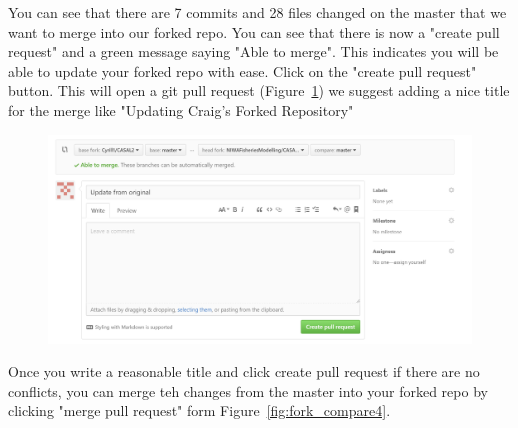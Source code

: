 You can see that there are 7 commits and 28 files changed on the master that we want to merge into our forked repo. You can see that there is now a "create pull request" and a green message saying "Able to merge". This indicates you will be able to update your forked repo with ease. Click on the "create pull request" button. This will open a git pull request (Figure~\ref{fig:fork_compare3}) we suggest adding a nice title for the merge like "Updating Craig's Forked Repository" 
\clearpage
\begin{figure}[!ht]
	\centering
	\includegraphics[scale=0.6]{Figures/Compare_fork5.png}
	\caption{}\label{fig:fork_compare3}
\end{figure}

Once you write a reasonable title and click create pull request if there are no conflicts, you can merge teh changes from the master into your forked repo by clicking "merge pull request" form Figure~\ref{fig:fork_compare4}.

